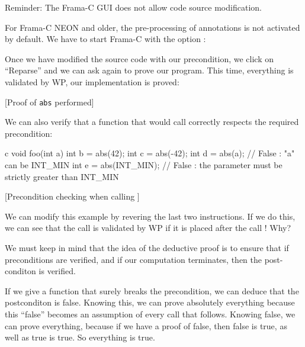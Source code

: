 \documentclass[middle]{zmdocument}
\begin{document}
\begin{Warning}
  Reminder: The Frama-C GUI does not allow code source modification.
\end{Warning}


\begin{Information}
  For Frama-C NEON and older, the
  pre-processing of annotations is not activated by default. We
  have to start Frama-C with the option :

\end{Information}


Once we have modified the source code with our precondition, we click on
``Reparse'' and we can ask again to prove our program. This time,
everything is validated by WP, our implementation is proved:



[Proof of \texttt{abs} performed]


We can also verify that a function that would call 
correctly respects the required precondition:



\begin{CodeBlock}{c}
void foo(int a){
   int b = abs(42);
   int c = abs(-42);
   int d = abs(a);       // False : "a" can be INT_MIN
   int e = abs(INT_MIN); // False : the parameter must be strictly greater than INT_MIN
}
\end{CodeBlock}



[Precondition checking when calling ]


We can modify this example by revering the last two instructions. If we
do this, we can see that the call  is validated by WP if
it is placed after the call ! Why?



We must keep in mind that the idea of the deductive proof is to ensure
that if preconditions are verified, and if our computation terminates,
then the post-conditon is verified.



If we give a function that surely breaks the precondition, we can deduce
that the postconditon is false. Knowing this, we can prove absolutely
everything because this ``false'' becomes an assumption of every call
that follows. Knowing false, we can prove everything, because if we have
a proof of false, then false is true, as well as true is true. So
everything is true.
\end{document}
